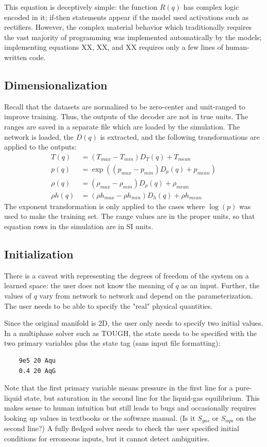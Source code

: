 \documentclass[AMA,STIX1COL]{WileyNJD-v2}
\begin{document}
This equation is deceptively simple: the function $R(q)$ has complex logic encoded in it; if-then
statements appear if the model used activations such as rectifiers.
However, the complex material behavior which traditionally requires
the vast majority of programming was implemented automatically by the
models; implementing equations XX, XX, and XX requires only a few lines
of human-written code. 

\subsection{Dimensionalization}

Recall that the datasets are normalized to be zero-center and
unit-ranged to improve training. Thus, the outputs of the decoder are not in true
units.
The ranges are saved in a separate file which are loaded by the
simulation. The network is loaded, the $D(q)$ is extracted, and the following
transformations are applied to the outputs:
\begin{align}
T(q)      &= \left(T_{max}-T_{min}\right) D_T(q) +T_{mean} \\
p(q)      &= \exp\left(\left( p_{max}-p_{min}\right)
            D_p(q) +p_{mean} \right) \\
\rho(q) &= \left(\rho_{max}-\rho_{min}\right) D_{\rho}(q) +\rho_{mean}\\
\rho h(q)      &= \left(\rho h_{max}-\rho h_{min}\right) D_h(q)  + \rho h_{mean}
\end{align}
The exponent transformation is only applied to the cases where
$\log(p)$ was used to make the training set.
The range values are in the proper units, so that equation rows in the
simulation are in SI units.


\hypertarget{header-n3339}{%
\subsection{Initialization}\label{header-n3339}}

There is a caveat with representing the degrees of freedom of the system
on a learned space: the user does not know the meaning of $q$ as an
input. Further, the values of $q$ vary from network to network and
depend on the parameterization. The user needs to be able to specify the
"real" physical quantities.

Since the original manifold is 2D, the user only needs to specify two
initial values. In a multiphase solver such as TOUGH, the state needs
to be specified with the two primary variables plus the state tag (sans input file formatting): 
\begin{verbatim}
    9e5 20 Aqu
    0.4 20 AqG
\end{verbatim}
Note that the first primary variable means pressure in the first line
for a pure-liquid state,
but saturation in the second line for the liquid-gas equilibrium.
This makes sense to human intuition but
still leads to bugs and occasionally requires looking up values in
textbooks or the software manual. (Is it $S_{gas}$ or $S_{aqu}$ on the second
line?) A fully fledged solver needs to check the user specified
initial conditions for erroneous inputs, but it cannot detect ambiguities.
\end{document}
